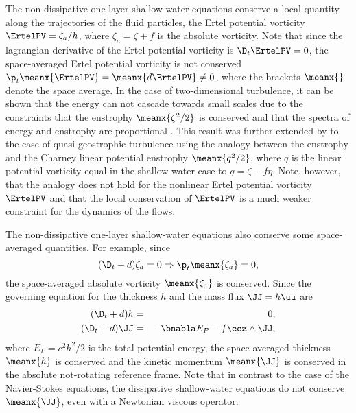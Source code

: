 The non-dissipative one-layer shallow-water equations conserve a local
quantity along the trajectories of the fluid particles, the Ertel
potential vorticity $\ErtelPV = \zeta_a/h$, where $\zeta_a = \zeta +
f$ is the absolute vorticity.
%
Note that since the lagrangian derivative of the Ertel potential
vorticity is $\D_t \ErtelPV = 0$, the space-averaged Ertel potential
vorticity is not conserved $\p_t \meanx{\ErtelPV} = \meanx{d \ErtelPV}
\neq 0 $, where the brackets $\meanx{}$ denote the space average.
%
In the case of two-dimensional turbulence, it can be shown that the
energy can not cascade towards small scales due to the 
constraints that the enstrophy $\meanx{ \zeta^2/2 }$ is conserved and
that the spectra of energy and enstrophy are proportional
\cite[]{Kraichnan1967}.
%
This result was further extended by \cite{Charney1971} to the case of
quasi-geostrophic turbulence using the analogy between the
enstrophy and the Charney linear potential enstrophy $\meanx{ q^2/2
}$, where $q$ is the linear potential vorticity equal in the shallow
water case to $q = \zeta - f \eta$.
%
Note, however, that the analogy does not hold for the nonlinear Ertel
potential vorticity $\ErtelPV$ and that the local conservation of
$\ErtelPV$ is a much weaker constraint for the dynamics of the flows.


The non-dissipative one-layer shallow-water equations also conserve
some space-averaged quantities.
%
For example, since
\begin{equation}
(\D_t+d) \zeta_a = 0 \Rightarrow \p_t \meanx{\zeta_a} = 0 ,
\end{equation}
the space-averaged absolute vorticity $\meanx{\zeta_a }$ is conserved.
Since the governing equation for the thickness $h$ and the mass flux
$\JJ = h \uu$ are
\begin{eqnarray}
(\D_t+d) h 
&=& 0, \label{eq_h_2}\\
(\D_t+d) \JJ 
&=& - \bnabla E_P - f \eez \wedge \JJ, \label{eq_JJ}
\end{eqnarray}
where $E_P = c^2 h^2/2$ is the total potential energy, the
space-averaged thickness $\meanx{ h }$ is conserved and the kinetic
momentum $\meanx{ \JJ }$ is conserved in the absolute not-rotating
reference frame.
%
Note that in contrast to the case of the Navier-Stokes equations, 
the dissipative shallow-water equations do not conserve $\meanx{ \JJ }$,
even with a Newtonian viscous operator.

